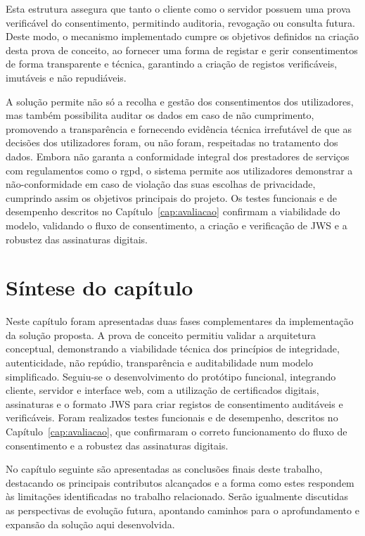 Esta estrutura assegura que tanto o cliente como o servidor possuem uma prova verificável do consentimento, permitindo auditoria, revogação ou consulta futura. Deste modo, o mecanismo implementado cumpre os objetivos definidos na criação desta prova de conceito, ao fornecer uma forma de registar e gerir consentimentos de forma transparente e técnica, garantindo a criação de registos verificáveis, imutáveis e não repudiáveis.

A solução permite não só a recolha e gestão dos consentimentos dos utilizadores, mas também possibilita auditar os dados em caso de não cumprimento, promovendo a transparência e fornecendo evidência técnica irrefutável de que as decisões dos utilizadores foram, ou não foram, respeitadas no tratamento dos dados. Embora não garanta a conformidade integral dos prestadores de serviços com regulamentos como o \acrshort{rgpd}, o sistema permite aos utilizadores demonstrar a não-conformidade em caso de violação das suas escolhas de privacidade, cumprindo assim os objetivos principais do projeto. Os testes funcionais e de desempenho descritos no Capítulo~\ref{cap:avaliacao} confirmam a viabilidade do modelo, validando o fluxo de consentimento, a criação e verificação de JWS e a robustez das assinaturas digitais.

\section{Síntese do capítulo}

Neste capítulo foram apresentadas duas fases complementares da implementação da solução proposta. A prova de conceito permitiu validar a arquitetura conceptual, demonstrando a viabilidade técnica dos princípios de integridade, autenticidade, não repúdio, transparência e auditabilidade num modelo simplificado. Seguiu-se o desenvolvimento do protótipo funcional, integrando cliente, servidor e interface web, com a utilização de certificados digitais, assinaturas e o formato JWS para criar registos de consentimento auditáveis e verificáveis. Foram realizados testes funcionais e de desempenho, descritos no Capítulo~\ref{cap:avaliacao}, que confirmaram o correto funcionamento do fluxo de consentimento e a robustez das assinaturas digitais.  

No capítulo seguinte são apresentadas as conclusões finais deste trabalho, destacando os principais contributos alcançados e a forma como estes respondem às limitações identificadas no trabalho relacionado. Serão igualmente discutidas as perspectivas de evolução futura, apontando caminhos para o aprofundamento e expansão da solução aqui desenvolvida.
